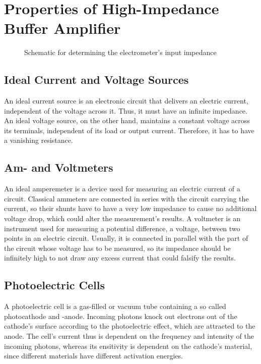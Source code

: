 \chapter{Properties of High-Impedance Buffer Amplifier}
\begin{figure}
	\centering
	\caption{Schematic for determining the electrometer's input impedance}
	\label{fig:elec_in_im}
\end{figure}

\section{Ideal Current and Voltage Sources}
An ideal current source is an electronic circuit that delivers an electric current, independent of the voltage across it.
Thus, it must have an infinite impedance.
An ideal voltage source, on the other hand, maintains a constant voltage across its terminals, independent of its load or output current.
Therefore, it has to have a vanishing resistance.

\section{Am- and Voltmeters}
An ideal amperemeter is a device used for measuring an electric current of a circuit.
Classical ammeters are connected in series with the circuit carrying the current, so their shunts have to have a very low impedance to cause no additional voltage drop, which could alter the measurement's results.
A voltmeter is an instrument used for measuring a potential difference, a voltage, between two points in an electric circuit.
Usually, it is connected in parallel with the part of the circuit whose voltage has to be measured, so its impedance should be infinitely high to not draw any excess current that could falsify the results.

\section{Photoelectric Cells}
A photoelectric cell is a gas-filled or vacuum tube containing a so called photocathode and -anode.
Incoming photons knock out electrons out of the cathode's surface according to the photoelectric effect, which are attracted to the anode.
The cell's current thus is dependent on the frequency and intensity of the incoming photons, whereas its ensitivity is dependent on the cathode's material, since different materials have different activation energies.

